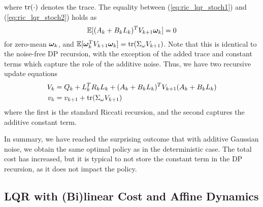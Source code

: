 where $\text{tr}(\cdot)$ denotes the trace. The equality between (\ref{eq:ric_lqr_stoch1}) and (\ref{eq:ric_lqr_stoch2}) holds as 
\begin{equation}
    \mathbb{E}[(A_{k} + B_{k} L_{k})^T V_{k+1} \bm{\omega}_{k}] = 0
\end{equation} 
for zero-mean $\bm{\omega}_{k}$, and $\mathbb{E}[\bm{\omega}_{k}^T V_{k+1} \bm{\omega}_{k}] = \text{tr}(\Sigma_{\omega} V_{k+1})$. Note that this is identical to the noise-free DP recursion, with the exception of the added trace and constant terms which capture the role of the additive noise. Thus, we have two recursive update equations
\begin{align}
    V_k &= Q_{k}  + L_{k}^T R_{k} L_{k} + (A_{k} + B_{k} L_{k})^T V_{k+1}   (A_{k} + B_{k} L_{k}) \\
    v_k &= v_{k+1} + \text{tr}(\Sigma_{\omega} V_{k+1}) 
\end{align}
where the first is the standard Riccati recursion, and the second captures the additive constant term. 

In summary, we have reached the surprising outcome that with additive Gaussian noise, we obtain the same optimal policy as in the deterministic case. The total cost has increased, but it is typical to not store the constant term in the DP recursion, as it does not impact the policy. 

\subsection{LQR with (Bi)linear Cost and Affine Dynamics}

